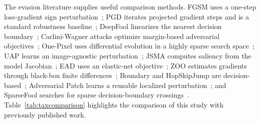 \documentclass[conference]{IEEEtran}
\begin{document}
The evasion literature supplies useful comparison methods. FGSM uses a one-step loss-gradient sign perturbation~\cite{goodfellow2014}; PGD iterates projected gradient steps and is a standard robustness baseline~\cite{madry2017}; DeepFool linearizes the nearest decision boundary~\cite{deepfool}; Carlini-Wagner attacks optimize margin-based adversarial objectives~\cite{cw}; One-Pixel uses differential evolution in a highly sparse search space~\cite{onepixel}; UAP learns an image-agnostic perturbation~\cite{uap}; JSMA computes saliency from the model Jacobian~\cite{jsma}; EAD uses an elastic-net objective~\cite{ead}; ZOO estimates gradients through black-box finite differences~\cite{zoo}; Boundary and HopSkipJump are decision-based~\cite{boundaryattack,hopskipjump}; Adversarial Patch learns a reusable localized perturbation~\cite{adversarialpatch}; and SparseFool searches for sparse decision-boundary crossings~\cite{sparsefool}.
Table~\ref{tab:taxcomparison} highlights the comparison of this study with previously published work.
\end{document}
